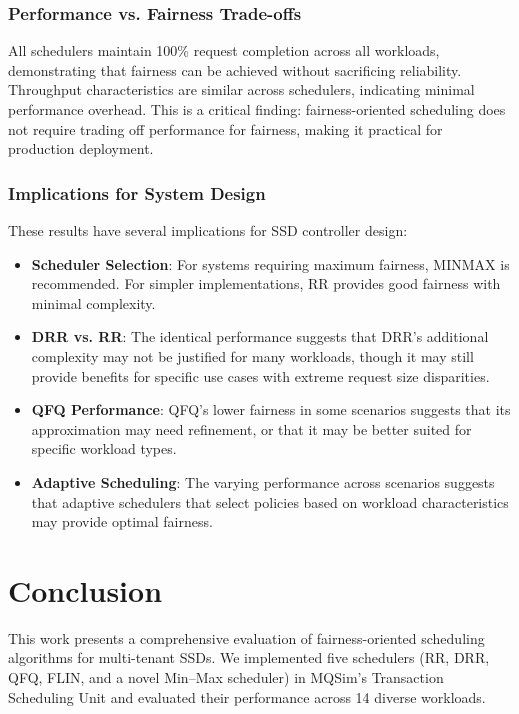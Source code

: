 \documentclass[11pt]{article}
\begin{document}
\subsubsection{Performance vs. Fairness Trade-offs}

All schedulers maintain 100\% request completion across all workloads, demonstrating that fairness can be achieved without sacrificing reliability. Throughput characteristics are similar across schedulers, indicating minimal performance overhead. This is a critical finding: fairness-oriented scheduling does not require trading off performance for fairness, making it practical for production deployment.

\subsubsection{Implications for System Design}

These results have several implications for SSD controller design:
\begin{itemize}
    \item \textbf{Scheduler Selection}: For systems requiring maximum fairness, MINMAX is recommended. For simpler implementations, RR provides good fairness with minimal complexity.
    \item \textbf{DRR vs. RR}: The identical performance suggests that DRR's additional complexity may not be justified for many workloads, though it may still provide benefits for specific use cases with extreme request size disparities.
    \item \textbf{QFQ Performance}: QFQ's lower fairness in some scenarios suggests that its approximation may need refinement, or that it may be better suited for specific workload types.
    \item \textbf{Adaptive Scheduling}: The varying performance across scenarios suggests that adaptive schedulers that select policies based on workload characteristics may provide optimal fairness.
\end{itemize}

\section{Conclusion}

This work presents a comprehensive evaluation of fairness-oriented scheduling algorithms for multi-tenant SSDs. We implemented five schedulers (RR, DRR, QFQ, FLIN, and a novel Min--Max scheduler) in MQSim's Transaction Scheduling Unit and evaluated their performance across 14 diverse workloads.
\end{document}
